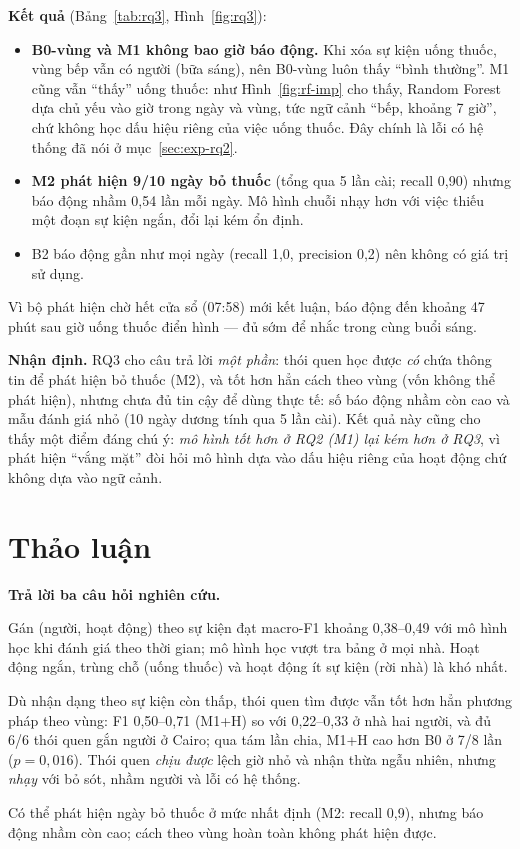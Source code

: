 \textbf{Kết quả} (Bảng~\ref{tab:rq3}, Hình~\ref{fig:rq3}):
\begin{itemize}
  \item \textbf{B0-vùng và M1 không bao giờ báo động.} Khi xóa sự kiện uống thuốc, vùng bếp vẫn có người
  (bữa sáng), nên B0-vùng luôn thấy ``bình thường''. M1 cũng vẫn ``thấy'' uống thuốc: như Hình~\ref{fig:rf-imp} cho thấy, Random
  Forest dựa chủ yếu vào giờ trong ngày và vùng, tức ngữ cảnh ``bếp, khoảng 7 giờ'', chứ không học dấu
  hiệu riêng của việc uống thuốc. Đây chính là lỗi có
  hệ thống đã nói ở mục~\ref{sec:exp-rq2}.
  \item \textbf{M2 phát hiện 9/10 ngày bỏ thuốc} (tổng qua 5 lần cài; recall 0,90) nhưng báo động nhầm
  0,54 lần mỗi ngày.
  Mô hình chuỗi nhạy hơn với việc thiếu một đoạn sự kiện ngắn, đổi lại kém ổn định.
  \item B2 báo động gần như mọi ngày (recall 1,0, precision 0,2) nên không có giá trị sử dụng.
\end{itemize}
Vì bộ phát hiện chờ hết cửa sổ (07:58) mới kết luận, báo động đến khoảng 47 phút sau giờ uống thuốc điển
hình --- đủ sớm để nhắc trong cùng buổi sáng.

\textbf{Nhận định.} RQ3 cho câu trả lời \emph{một phần}: thói quen học được \emph{có} chứa thông tin để
phát hiện bỏ thuốc (M2), và tốt hơn hẳn cách theo vùng (vốn không thể phát hiện), nhưng chưa đủ tin cậy
để dùng thực tế: số báo động nhầm còn cao và mẫu đánh giá nhỏ (10 ngày dương tính qua 5 lần cài). Kết
quả này cũng cho thấy một điểm đáng chú ý: \emph{mô hình tốt hơn ở RQ2 (M1) lại kém hơn ở RQ3}, vì phát
hiện ``vắng mặt'' đòi hỏi mô hình dựa vào dấu hiệu riêng của hoạt động chứ không dựa vào ngữ cảnh.

\section{Thảo luận}
\label{sec:exp-discussion}

\textbf{Trả lời ba câu hỏi nghiên cứu.}
\begin{description}[leftmargin=1.2cm,style=sameline]
  \item[RQ1] Gán (người, hoạt động) theo sự kiện đạt macro-F1 khoảng 0,38--0,49 với mô hình học khi đánh
  giá theo thời gian; mô hình học vượt tra bảng ở mọi nhà. Hoạt động ngắn, trùng chỗ (uống thuốc) và hoạt
  động ít sự kiện (rời nhà) là khó nhất.
  \item[RQ2] Dù nhận dạng theo sự kiện còn thấp, thói quen tìm được vẫn tốt hơn hẳn phương pháp theo vùng:
  F1 0,50--0,71 (M1+H) so với 0,22--0,33 ở nhà hai người, và đủ 6/6 thói quen gắn người ở Cairo; qua tám
  lần chia, M1+H cao hơn B0 ở 7/8 lần ($p = 0{,}016$). Thói quen
  \emph{chịu được} lệch giờ nhỏ và nhận thừa ngẫu nhiên, nhưng \emph{nhạy} với bỏ sót, nhầm người và lỗi
  có hệ thống.
  \item[RQ3] Có thể phát hiện ngày bỏ thuốc ở mức nhất định (M2: recall 0,9), nhưng báo động nhầm còn cao;
  cách theo vùng hoàn toàn không phát hiện được.
\end{description}

